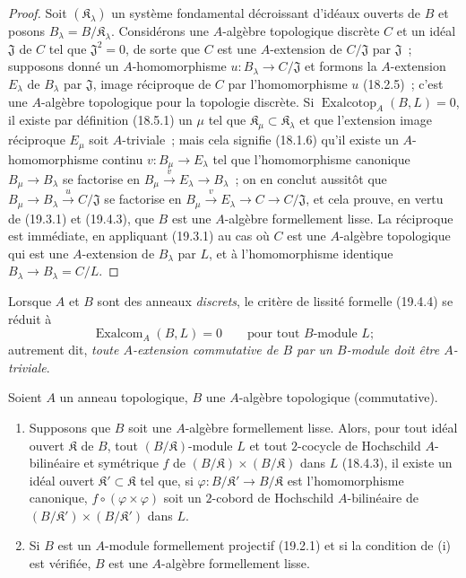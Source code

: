 \begin{proof}
Soit $(\mathfrak K_\lambda)$ un système fondamental décroissant d'idéaux
ouverts de $B$ et posons $B_\lambda=B/\mathfrak K_\lambda$.
Considérons une $A$-algèbre topologique discrète $C$ et un idéal
$\mathfrak J$ de $C$ tel que $\mathfrak J^2=0$, de sorte que $C$ est une
$A$-extension de $C/\mathfrak J$ par $\mathfrak J$~; supposons donné un
$A$-homomorphisme $u:B_\lambda\to C/\mathfrak J$ et formons la
$A$-extension $E_\lambda$ de $B_\lambda$ par $\mathfrak J$, image
réciproque de $C$ par l'homomorphisme $u$ (18.2.5)~; c'est une $A$-algèbre
topologique pour la topologie discrète. Si
$\operatorname{Exalcotop}_A(B,L)=0$, il existe par définition (18.5.1) un
$\mu$ tel que $\mathfrak K_\mu\subset\mathfrak K_\lambda$ et que
l'extension image réciproque $E_\mu$ soit $A$-triviale~; mais cela signifie
(18.1.6) qu'il existe un $A$-homomorphisme continu
$v:B_\mu\to E_\lambda$ tel que l'homomorphisme canonique
$B_\mu\to B_\lambda$ se factorise en
$B_\mu\xrightarrow{v}E_\lambda\to B_\lambda$~; on en conclut
aussitôt que $B_\mu\to B_\lambda\xrightarrow{u}C/\mathfrak J$ se
factorise en
$B_\mu\xrightarrow{v}E_\lambda\to C\to C/\mathfrak J$, et cela
prouve, en vertu de (19.3.1) et (19.4.3), que $B$ est une $A$-algèbre
formellement lisse. La réciproque est immédiate, en appliquant (19.3.1) au cas
où $C$ est une $A$-algèbre topologique qui est une $A$-extension de
$B_\lambda$ par $L$, et à l'homomorphisme identique
$B_\lambda\to B_\lambda=C/L$.
\end{proof}

Lorsque $A$ et $B$ sont des anneaux \emph{discrets}, le critère de lissité formelle
(19.4.4) se réduit à
\begin{equation}
\tag{19.4.4.1}
\label{0.19.4.4.1-fr}
\operatorname{Exalcom}_A(B,L)=0\qquad\text{pour tout $B$-module $L$};
\end{equation}
autrement dit, \emph{toute $A$-extension commutative de $B$ par un
$B$-module doit être $A$-triviale}.

\begin{corollary}[19.4.5]
\label{0.19.4.5-fr}
Soient $A$ un anneau topologique, $B$ une $A$-algèbre topologique
(commutative).
\begin{enumerate}
  \item[\textup{(i)}] Supposons que $B$ soit une $A$-algèbre formellement lisse.
  Alors, pour tout idéal ouvert $\mathfrak K$ de $B$, tout
  $(B/\mathfrak K)$-module $L$ et tout $2$-cocycle de Hochschild
  $A$-bilinéaire et symétrique $f$ de
  $(B/\mathfrak K)\times(B/\mathfrak K)$ dans $L$ \textup{(18.4.3)}, il existe un
  idéal ouvert $\mathfrak K'\subset\mathfrak K$ tel que, si
  $\varphi:B/\mathfrak K'\to B/\mathfrak K$ est l'homomorphisme
  canonique, $f\circ(\varphi\times\varphi)$ soit un $2$-cobord de
  Hochschild $A$-bilinéaire de
  $(B/\mathfrak K')\times(B/\mathfrak K')$ dans $L$.
  \item[\textup{(ii)}] Si $B$ est un $A$-module formellement projectif \textup{(19.2.1)} et si
  la condition de \textup{(i)} est vérifiée, $B$ est une $A$-algèbre formellement
  lisse.
\end{enumerate}
\end{corollary}

